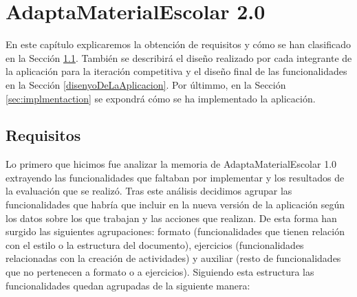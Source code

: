 \chapter{AdaptaMaterialEscolar 2.0}
\label{cap:AdaptaMaterialEscolar2.0}
En este capítulo explicaremos la obtención de requisitos y cómo se han clasificado en la Sección \ref{cap:requisitos}. También se describirá el diseño realizado por cada integrante de la aplicación para la iteración competitiva y el diseño final de las funcionalidades en la Sección \ref{disenyoDeLaAplicacion}. Por últimmo, en la Sección \ref{sec:implmentaction} se expondrá cómo se ha implementado la aplicación.

\section{Requisitos}
\label{cap:requisitos}

Lo primero que hicimos fue analizar la memoria de AdaptaMaterialEscolar 1.0 \citep*{AdaptaMaterialEscolar1.0} extrayendo las funcionalidades que faltaban por implementar y los resultados de la evaluación que se realizó. Tras este análisis decidimos agrupar las funcionalidades que habría que incluir en la nueva versión de la aplicación según los datos sobre los que trabajan y las acciones que realizan. De esta forma han surgido las siguientes agrupaciones: formato (funcionalidades que tienen relación con el estilo o la estructura del documento), ejercicios (funcionalidades relacionadas con la creación de actividades) y auxiliar (resto de funcionalidades que no pertenecen a formato o a ejercicios). Siguiendo esta estructura las funcionalidades quedan agrupadas de la siguiente manera:
\\

